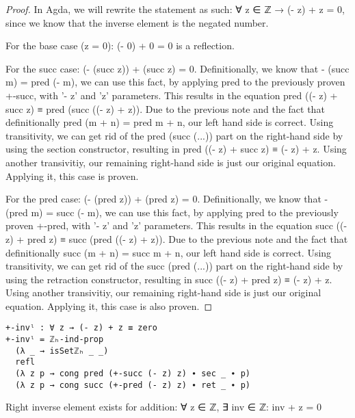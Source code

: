 \begin{proof}
  In Agda, we will rewrite the statement as such: ∀ z ∈ ℤ → (- z) + z = 0, since we know that the inverse element is the negated number.

  For the base case (z = 0): (- 0) + 0 = 0 is a reflection.

  For the succ case: (- (succ z)) + (succ z) = 0. Definitionally, we know that - (succ m) = pred (- m), we can use this fact, by applying pred to the previously proven +-succ, with '- z' and 'z' parameters. This results in the equation pred ((- z) + succ z) ≡ pred (succ ((- z) + z)). Due to the previous note and the fact that definitionally pred (m + n) = pred m + n, our left hand side is correct. Using transitivity, we can get rid of the pred (succ (...)) part on the right-hand side by using the section constructor, resulting in pred ((- z) + succ z) ≡ (- z) + z. Using another transivitiy, our remaining right-hand side is just our original equation. Applying it, this case is proven.

  For the pred case: (- (pred z)) + (pred z) = 0. Definitionally, we know that - (pred m) = succ (- m), we can use this fact, by applying pred to the previously proven +-pred, with '- z' and 'z' parameters. This results in the equation succ ((- z) + pred z) ≡ succ (pred ((- z) + z)). Due to the previous note and the fact that definitionally succ (m + n) = succ m + n, our left hand side is correct. Using transitivity, we can get rid of the succ (pred (...)) part on the right-hand side by using the retraction constructor, resulting in succ ((- z) + pred z) ≡ (- z) + z. Using another transivitiy, our remaining right-hand side is just our original equation. Applying it, this case is also proven.
\end{proof}

\begin{listing}[H]
\begin{verbatim}
+-invˡ : ∀ z → (- z) + z ≡ zero
+-invˡ = ℤₕ-ind-prop
  (λ _ → isSetℤₕ _ _)
  refl
  (λ z p → cong pred (+-succ (- z) z) ∙ sec _ ∙ p)
  (λ z p → cong succ (+-pred (- z) z) ∙ ret _ ∙ p)
\end{verbatim}
\caption{Agda proof of addition having a left inverse element}
\end{listing}

\begin{theorem}
  Right inverse element exists for addition: ∀ z ∈ ℤ, ∃ inv ∈ ℤ: inv + z = 0
\end{theorem}

